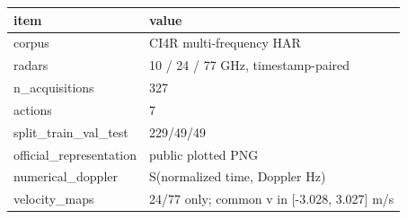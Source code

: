 \begin{tabular}{ll}
\hline
item & value \\
\hline
corpus & CI4R multi-frequency HAR \\
radars & 10 / 24 / 77 GHz, timestamp-paired \\
n\_acquisitions & 327 \\
actions & 7 \\
split\_train\_val\_test & 229/49/49 \\
official\_representation & public plotted PNG \\
numerical\_doppler & S(normalized time, Doppler Hz) \\
velocity\_maps & 24/77 only; common v in [-3.028, 3.027] m/s \\
\hline
\end{tabular}
